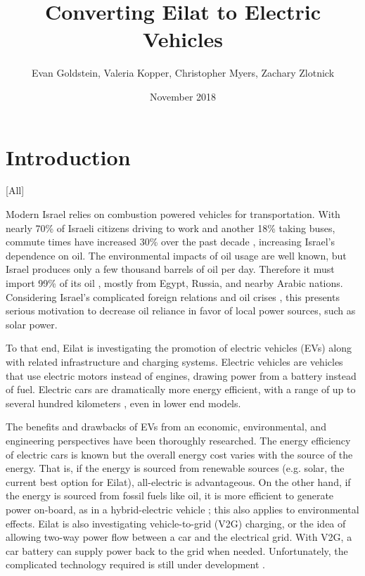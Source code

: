 \documentclass[12pt]{article}                         %
\title{Converting Eilat to Electric Vehicles}
\author{Evan Goldstein, Valeria Kopper, Christopher Myers, Zachary Zlotnick}
\date{November 2018}
\begin{document}
\maketitle
\newpage

\renewcommand\abstractname{Summary} %

\tableofcontents
\newpage
\listofauthorships
\newpage
{}
\doublespacing

\section{Introduction}[All]

Modern Israel relies on combustion powered vehicles for transportation. With nearly 70\% of Israeli citizens driving to work and another 18\% taking buses, commute times have increased 30\% over the past decade \cite{Dori2018IsraeliRoads}, increasing Israel's dependence on oil. The environmental impacts of oil usage are well known, but Israel produces only a few thousand barrels of oil per day. Therefore it must import 99\% of its oil \cite{Engber2006WhereOil}, mostly from Egypt, Russia, and nearby Arabic nations. Considering Israel's complicated foreign relations and oil crises \cite{Engber2006WhereOil}, this presents serious motivation to decrease oil reliance in favor of local power sources, such as solar power.

To that end, Eilat is investigating the promotion of electric vehicles (EVs) along with related infrastructure and charging systems. Electric vehicles are vehicles that use electric motors instead of engines, drawing power from a battery instead of fuel. Electric cars are dramatically more energy efficient, with a range of up to several hundred kilometers \cite{Friel2010ManagementVehicles}, even in lower end models.

The benefits and drawbacks of EVs from an economic, environmental, and engineering perspectives have been thoroughly researched. The energy efficiency of electric cars is known but the overall energy cost varies with the source of the energy. That is, if the energy is sourced from renewable sources (e.g. solar, the current best option for Eilat), all-electric is advantageous. On the other hand, if the energy is sourced from fossil fuels like oil, it is more efficient to generate power on-board, as in a hybrid-electric vehicle \cite{Dincer2010EconomicOptions}; this also applies to environmental effects. Eilat is also investigating vehicle-to-grid (V2G) charging, or the idea of allowing two-way power flow between a car and the electrical grid. With V2G, a car battery can supply power back to the grid when needed. Unfortunately, the complicated technology required is still under development \cite{2018Nuvve...}.
\end{document}
